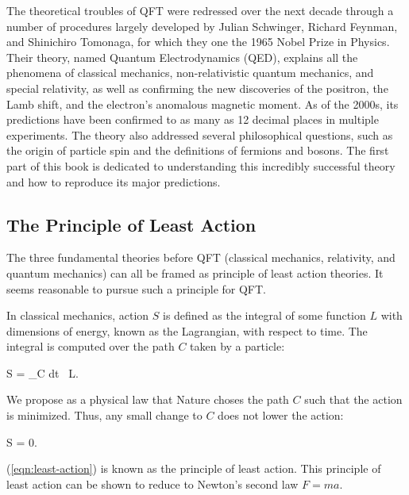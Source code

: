 The theoretical troubles of QFT were redressed over the next decade through a number of procedures largely developed by Julian Schwinger, Richard Feynman, and Shinichiro Tomonaga, for which they one the 1965 Nobel Prize in Physics. Their theory, named Quantum Electrodynamics (QED), explains all the phenomena of classical mechanics, non-relativistic quantum mechanics, and special relativity, as well as confirming the new discoveries of the positron, the Lamb shift, and the electron's anomalous magnetic moment. As of the 2000s, its predictions have been confirmed to as many as 12 decimal places in multiple experiments. The theory also addressed several philosophical questions, such as the origin of particle spin and the definitions of fermions and bosons. The first part of this book is dedicated to understanding this incredibly successful theory and how to reproduce its major predictions.

\subsection{The Principle of Least Action}

The three fundamental theories before QFT (classical mechanics, relativity, and quantum mechanics) can all be framed as principle of least action theories. It seems reasonable to pursue such a principle for QFT.

In classical mechanics, action $S$ is defined as the integral of some function $L$ with dimensions of energy, known as the Lagrangian, with respect to time. The integral is computed over the path $C$ taken by a particle:
\begin{e}
  S = \int_C dt \, L.
  \label{eqn:classical-action}
\end{e}
We propose as a physical law that Nature choses the path $C$ such that the action is minimized. Thus, any small change to $C$ does not lower the action:
\begin{e}
  \delta S = 0.
  \label{eqn:least-action}
\end{e}
(\ref{eqn:least-action}) is known as the principle of least action. This principle of least action can be shown to reduce to Newton's second law $F=ma$.

